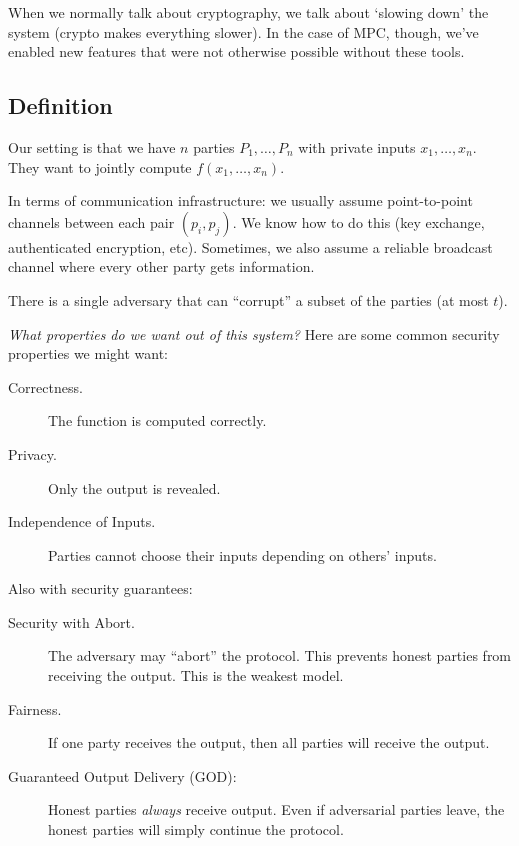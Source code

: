 When we normally talk about cryptography, we talk about `slowing down' the system (crypto makes everything slower). In the case of MPC, though, we've enabled new features that were not otherwise possible without these tools.

\subsection{Definition}
Our setting is that we have $n$ parties $P_1, \dots, P_n$ with private inputs $x_1, \dots, x_n$. They want to jointly compute $f(x_1, \dots, x_n)$.

In terms of communication infrastructure: we usually assume point-to-point channels between each pair $(p_i, p_j)$. We know how to do this (key exchange, authenticated encryption, etc). Sometimes, we also assume a reliable broadcast channel where every other party gets information.

There is a single adversary that can ``corrupt'' a subset of the parties (at most $t$).

\emph{What properties do we want out of this system?} Here are some common security properties we might want:
\begin{description}
    \item[Correctness.] The function is computed correctly.
    \item[Privacy.] Only the output is revealed.
    \item[Independence of Inputs.] Parties cannot choose their inputs depending on others' inputs.
\end{description}
Also with security guarantees:
\begin{description}
    \item[Security with Abort.] The adversary may ``abort'' the protocol. This prevents honest parties from receiving the output. This is the weakest model.
    \item[Fairness.] If one party receives the output, then all parties will receive the output.
    \item[Guaranteed Output Delivery (GOD):] Honest parties \emph{always} receive output. Even if adversarial parties leave, the honest parties will simply continue the protocol.
\end{description}

